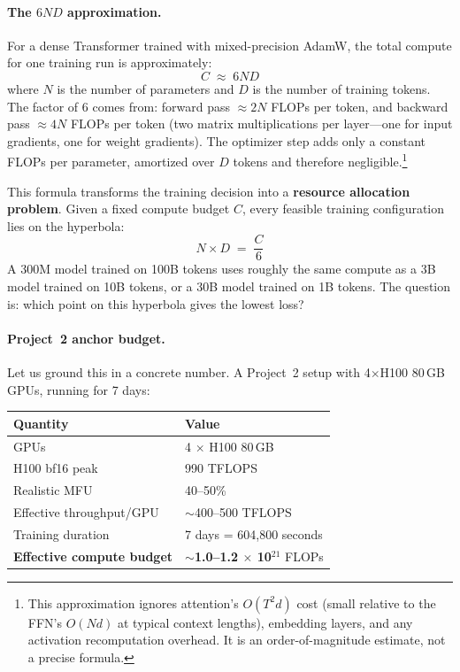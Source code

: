 \paragraph{The $6ND$ approximation.} For a dense Transformer trained with mixed-precision AdamW, the total compute for one training run is approximately:
\[
C \;\approx\; 6ND
\]
where $N$ is the number of parameters and $D$ is the number of training tokens. The factor of 6 comes from: forward pass $\approx 2N$ FLOPs per token, and backward pass $\approx 4N$ FLOPs per token (two matrix multiplications per layer---one for input gradients, one for weight gradients). The optimizer step adds only a constant FLOPs per parameter, amortized over $D$ tokens and therefore negligible.\footnote{This approximation ignores attention's $O(T^2 d)$ cost (small relative to the FFN's $O(Nd)$ at typical context lengths), embedding layers, and any activation recomputation overhead. It is an order-of-magnitude estimate, not a precise formula.}

This formula transforms the training decision into a \textbf{resource allocation problem}. Given a fixed compute budget $C$, every feasible training configuration lies on the hyperbola:
\[
N \times D \;=\; \frac{C}{6}
\]
A 300M model trained on 100B tokens uses roughly the same compute as a 3B model trained on 10B tokens, or a 30B model trained on 1B tokens. The question is: which point on this hyperbola gives the lowest loss?

\paragraph{Project~2 anchor budget.} Let us ground this in a concrete number. A Project~2 setup with 4$\times$H100 80\,GB GPUs, running for 7 days:

\begin{center}
\begin{tabular}{ll}
\toprule
\textbf{Quantity} & \textbf{Value} \\
\midrule
GPUs & 4 $\times$ H100 80\,GB \\
H100 bf16 peak & 990 TFLOPS \\
Realistic MFU & 40--50\% \\
Effective throughput/GPU & $\sim$400--500 TFLOPS \\
Training duration & 7 days = 604,800 seconds \\
\textbf{Effective compute budget} & $\sim$\textbf{1.0--1.2 $\times$ 10$^{21}$} FLOPs \\
\bottomrule
\end{tabular}
\end{center}

